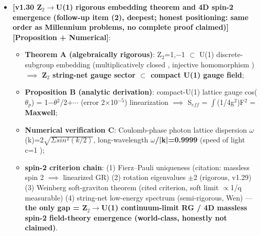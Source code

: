 \documentclass[12pt]{article}
\newcommand{\mtag}[1]{\textbf{[#1]}}
\newcommand{\up}[1]{\ensuremath{^{#1}}}
\newcommand{\down}[1]{\ensuremath{_{#1}}}
\begin{document}
\begin{itemize}
\begin{itemize}
\end{itemize}
\item \textbf{\mtag{v1.30 Z\down{2}\ensuremath{\to}U(1) rigorous embedding theorem and 4D spin-2 emergence (follow-up item (2), deepest; honest positioning: same order as Millennium problems, no complete proof claimed)}}\mtag{Proposition + Numerical}:
\begin{itemize}
\item \textbf{Theorem A (algebraically rigorous)}: Z\down{2}={1,\ensuremath{-}1} \ensuremath{\subset} U(1) discrete-subgroup embedding (multiplicatively closed \checkmark, injective homomorphism \checkmark) \ensuremath{\implies} \textbf{Z\down{2} string-net gauge sector \ensuremath{\subset} compact U(1) gauge field};
\item \textbf{Proposition B (analytic derivation)}: compact-U(1) lattice gauge cos(\ensuremath{\theta}\down{p}) = 1\ensuremath{-}\ensuremath{\theta}\up{2}/2+\ensuremath{\cdots} (error 2\ensuremath{\times}10\up{-5}) linearization \ensuremath{\implies} S\down{eff} = \ensuremath{\int}(1/4g\up{2})F\up{2} = \textbf{Maxwell};
\item \textbf{Numerical verification C}: Coulomb-phase photon lattice dispersion \ensuremath{\omega}(k)=2\ensuremath{\sqrt{\Sigma{}sin\up{2}(k/2)}}, long-wavelength \textbf{\ensuremath{\omega}/|k|=0.9999} (speed of light c=1 \checkmark);
\item \textbf{spin-2 criterion chain}: (1) Fierz--Pauli uniqueness (citation: massless spin 2 \ensuremath{\implies} linearized GR) (2) rotation eigenvalues \ensuremath{\pm}2 (rigorous, v1.29) (3) Weinberg soft-graviton theorem (cited criterion, soft limit \ensuremath{\propto}1/q measurable) (4) string-net low-energy spectrum (semi-rigorous, Wen) --- \textbf{the only gap = Z\down{2}\ensuremath{\to}U(1) continuum-limit RG / 4D massless spin-2 field-theory emergence (world-class, honestly not claimed)}.
\end{itemize}
\end{itemize}
\end{document}
